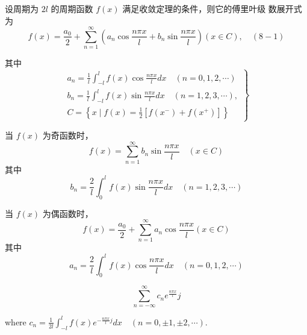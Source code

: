 \begin{theorem}
    设周期为 $ 2 l $ 的周期函数 $ f(x) $ 满足收敛定理的条件，则它的傅里叶级 数展开式为
\begin{equation}
f(x)=\frac{a_{0}}{2}+\sum_{n=1}^{\infty}\left(a_{n} \cos \frac{n \pi x}{l}+b_{n} \sin \frac{n \pi x}{l}\right)(x \in C), \quad(8-1)
\end{equation}

其中
\begin{equation}
\left.\begin{array}{l}
a_{n}=\frac{1}{l} \int_{-l}^{l} f(x) \cos \frac{n \pi x}{l} {d} x \quad(n=0,1,2, \cdots) \\
b_{n}=\frac{1}{l} \int_{-l}^{l} f(x) \sin \frac{n \pi x}{l} {d} x \quad(n=1,2,3, \cdots), \\
C=\left\{x \mid f(x)=\frac{1}{2}\left[f\left(x^{-}\right)+f\left(x^{+}\right)\right]\right\}
\end{array}\right\}
\end{equation}



当 $ f(x) $ 为奇函数时，
\begin{equation}
f(x)=\sum_{n=1}^{\infty} b_{n} \sin \frac{n \pi x}{l} \quad(x \in C)
\end{equation}
其中
\begin{equation}
b_{n}=\frac{2}{l} \int_{0}^{l} f(x) \sin \frac{n \pi x}{l} {d} x \quad(n=1,2,3, \cdots)
\end{equation}

当 $ f(x) $ 为偶函数时，
\begin{equation}
f(x)=\frac{a_{0}}{2}+\sum_{n=1}^{\infty} a_{n} \cos \frac{n \pi x}{l}(x \in C)
\end{equation}
其中
\begin{equation}
a_{n}=\frac{2}{l} \int_{0}^{l} f(x) \cos \frac{n \pi x}{l} {d} x \quad(n=0,1,2, \cdots)
\end{equation}
\end{theorem}

\begin{definition}[傅里叶级数的复数形式]
    \begin{equation} \sum_{n=-\infty}^{\infty} c_{n} {e}^{\frac{n \pi x}{l}}j \end{equation}

    where $c_{n}=\frac{1}{2 l} \int_{-l}^{l} f(x) {e}^{-\frac{n \pi x}{l} j} {d} x \quad(n=0, \pm 1, \pm 2, \cdots) $.
\end{definition}

